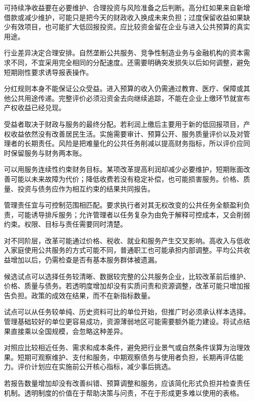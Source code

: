 \documentclass[UTF8,fontset=fandol,zihao=-4,oneside,openany]{ctexbook}
\begin{document}
\label{arg:P259}
可持续净收益要在必要维护、合理投资与风险准备之后判断。高分红如果来自新增借款或减少维护，可能只是把今天的财政收入换成未来负担；过度保留收益如果缺少有效项目，也可能扩大低回报投资。应比较资金留在企业与进入公共预算的真实用途。

行业差异决定合理安排。自然垄断公共服务、竞争性制造业务与金融机构的资本需求不同，不宜采用完全相同的分配速度。还需要明确突发损失以后如何调整，避免短期刚性要求诱导报表操作。

分红规则本身不能保证公众受益。进入预算的收入仍需通过教育、医疗、保障或其他公共用途传递。完整评价必须沿资金去向继续追踪，不能在企业上缴环节就宣布产权收益已经兑现。

受益者取决于财政与服务的最终分配。若利润上缴后主要用于新的低回报项目，产权收益依然没有改善居民生活。实施需要审计、预算公开、服务质量评价以及对管理者的长期责任。风险是把难量化的公共任务削减以提高财务指标，所以评价应同时保留服务与财务两本账。

\label{arg:P260}
可以用服务连续性约束财务目标。某项改革提高利润却减少必要维护，短期账面改善可能以未来故障为代价；降低收费若没有稳定补偿，也可能损害服务。价格、质量、投资与债务应作为相互约束的结果共同报告。

管理责任宜与可控制范围相匹配。要求执行者对其无权改变的公共任务全额盈利负责，可能诱导排斥服务；允许管理者以任务复杂为由免于解释可控成本，又会削弱约束。权限、目标与责任需要同时清楚。

对不同阶层，改革可能通过价格、税收、就业和服务产生交叉影响。高收入与低收入家庭使用公共服务的方式可能不同，普通职工也可能承担内部调整。平均公共收益增加以后，仍需检查是否有基本服务群体被遗漏。

候选试点可以选择任务较清晰、数据较完整的公共服务企业，比较改革前后维护、价格、质量与债务。若透明度增加却没有实质问责和资源调整，改革可能只增加报告负担。政策的成效在结果，而不在新指标数量。

\label{arg:P261}
试点可以从任务较单纯、历史资料可比的单位开始，但推广时必须承认样本选择。管理基础较好的单位更容易成功，资源薄弱地区可能需要额外能力建设。将试点结果直接乘以全国规模，会忽略这种差异。

对照应比较相近任务、需求和成本条件，避免把行业景气或自然条件误算为治理效果。短期可观察维护、支付和服务，中期观察债务与使用者负担，长期再评估能力。评价计划应在实施前公开核心指标，减少事后挑选。

若报告数量增加却没有改善纠错、预算调整和服务，应该简化形式负担并检查责任机制。透明制度的价值在于帮助决策与问责，不在于形成更多难以使用的表格。
\end{document}
